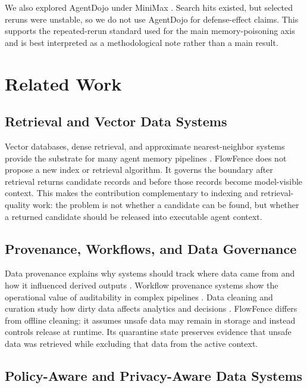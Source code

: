 \documentclass[conference]{IEEEtran}
\begin{document}
We also explored AgentDojo under MiniMax \cite{agentdojo}. Search hits existed, but selected reruns were unstable, so we do not use AgentDojo for defense-effect claims. This supports the repeated-rerun standard used for the main memory-poisoning axis and is best interpreted as a methodological note rather than a main result.

\section{Related Work}

\subsection{Retrieval and Vector Data Systems}

Vector databases, dense retrieval, and approximate nearest-neighbor systems provide the substrate for many agent memory pipelines \cite{pan2024vectordb,vbase,faiss,hnsw,dpr}. FlowFence does not propose a new index or retrieval algorithm. It governs the boundary after retrieval returns candidate records and before those records become model-visible context. This makes the contribution complementary to indexing and retrieval-quality work: the problem is not whether a candidate can be found, but whether a returned candidate should be released into executable agent context.

\subsection{Provenance, Workflows, and Data Governance}

Data provenance explains why systems should track where data came from and how it influenced derived outputs \cite{buneman2001why,cheney2009provenance}. Workflow provenance systems show the operational value of auditability in complex pipelines \cite{ursprung2019}. Data cleaning and curation study how dirty data affects analytics and decisions \cite{chu2016cleaning}. FlowFence differs from offline cleaning: it assumes unsafe data may remain in storage and instead controls release at runtime. Its quarantine state preserves evidence that unsafe data was retrieved while excluding that data from the active context.

\subsection{Policy-Aware and Privacy-Aware Data Systems}
\end{document}

